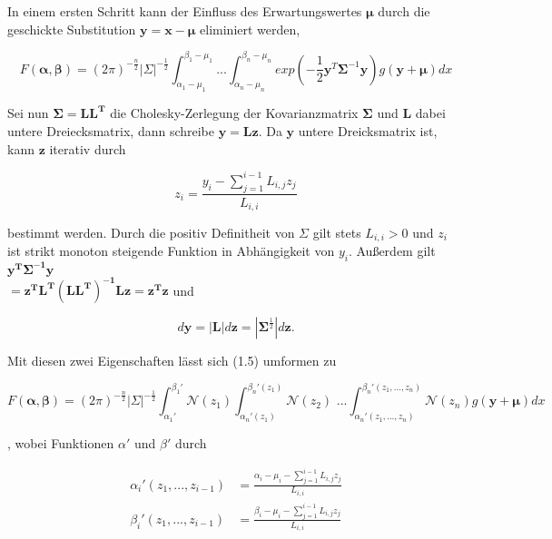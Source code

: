 \documentclass[12pt,a4paper]{scrartcl}
\numberwithin{equation}{section}
\begin{document}
In einem ersten Schritt kann der Einfluss des Erwartungswertes $\mathbf{\mu}$ durch die geschickte Substitution $\mathbf{y} = \mathbf{x} - \mathbf{\mu}$ eliminiert werden,

\begin{equation}
  F(\mathbf{\alpha},\mathbf{\beta}) = (2\pi)^{-\frac{n}{2}} |\Sigma|^{-\frac{1}{2}} \int_{\alpha_1 -\mu_1}^{\beta_1-\mu_1} ... \int_{\alpha_n - \mu_n}^{\beta_n - \mu_n} exp(-\frac{1}{2} \mathbf{y}^T \mathbf{\Sigma}^{-1}\mathbf{y}) g(\mathbf{y} + \mathbf{\mu}) dx
\end{equation}

Sei nun $\mathbf{\Sigma = L L^T}$ die Cholesky-Zerlegung der Kovarianzmatrix $\mathbf{\Sigma}$ und $\mathbf{L}$ dabei untere Dreiecksmatrix, dann schreibe $\mathbf{y = Lz}$. Da 
$\mathbf{y}$ untere Dreicksmatrix ist, kann $\mathbf{z}$ iterativ durch 

\begin{equation}
 z_i = \frac{y_i - \sum_{j=1}^{i-1} L_{i,j}z_j}{L_{i,i}}
\end{equation}

bestimmt werden. Durch die positiv Definitheit von $\Sigma$ gilt stets $L_{i,i} > 0$ und $z_i$ ist strikt monoton steigende Funktion in Abhängigkeit von $y_i$.
Außerdem gilt $\mathbf{y^T\Sigma^{-1}y}$ \\ $ \mathbf{= z^TL^T(LL^T)^{-1}Lz} = \mathbf{z^Tz} $ und 

\begin{equation}
 d\mathbf{y} = |\mathbf{L}|d \mathbf{z} = |\mathbf{\Sigma}^{\frac{1}{2}}| d \mathbf{z}.
\end{equation}

Mit diesen zwei Eigenschaften lässt sich (1.5) umformen zu 

\begin{equation}
  F(\mathbf{\alpha},\mathbf{\beta}) = (2\pi)^{-\frac{n}{2}} |\Sigma|^{-\frac{1}{2}} \int_{\alpha_1'}^{\beta_1'} \mathcal{N}(z_1) \int_{\alpha_n'(z_1)}^{\beta_n'(z_1)} \mathcal{N}(z_2) \text{ ...} \int_{\alpha_n'(z_1,...,z_n)}^{\beta_n'(z_1,...,z_n)} \mathcal{N}(z_n) g(\mathbf{y} + \mathbf{\mu}) dx
\end{equation}

, wobei Funktionen $\alpha'$ und $\beta'$ durch 

\begin{equation}
  \begin{split}
    \alpha_i'(z_1,...,z_{i-1})  &=  \frac{\alpha_i - \mu_i - \sum_{j=1}^{i-1} L_{i,j}z_j}{L_{i,i}} \\
    \beta_i'(z_1,...,z_{i-1})   &=  \frac{\beta_i - \mu_i - \sum_{j=1}^{i-1} L_{i,j}z_j}{L_{i,i}} 
  \end{split}
\end{equation}
\end{document}
